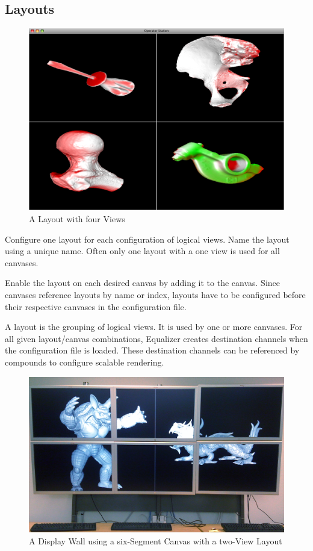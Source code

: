 \documentclass[10pt,a4]{scrartcl}
\begin{document}
\subsection{\label{sLayout}Layouts}

\begin{figure}
  \includegraphics[width=.382\textwidth]{images/layout.png}
  {\caption{\label{fLayout}A Layout with four Views}}
\end{figure}

Configure one \textsf{layout} for each configuration of logical
views. Name the layout using a unique name. Often only one layout with a
one view is used for all canvases.

Enable the layout on each desired canvas by adding it to the
canvas. Since canvases reference layouts by name or index, layouts have
to be configured before their respective canvases in the configuration
file.

A layout is the grouping of logical views. It is used by one or more
canvases. For all given layout/canvas combinations, Equalizer creates
destination channels when the configuration file is loaded. These
destination channels can be referenced by compounds to configure
scalable rendering.

\begin{figure}[ht!]\center
  \includegraphics[width=.9\textwidth]{images/wallLayout.jpg}
  {\caption{A Display Wall using a six-Segment Canvas with a two-View Layout}}
\end{figure}
\end{document}
